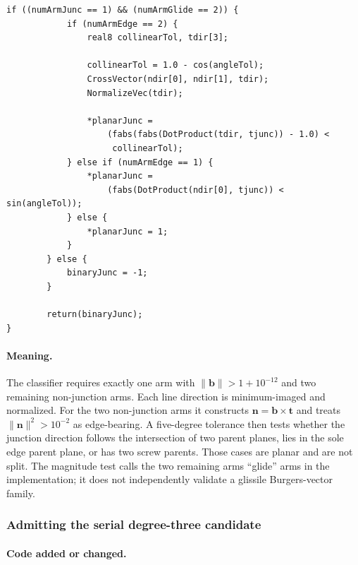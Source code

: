 \documentclass[11pt]{article}
\newcommand{\vect}[1]{\bm{#1}}
\begin{document}
\begin{lstlisting}[style=cpp]
        if ((numArmJunc == 1) && (numArmGlide == 2)) {
            if (numArmEdge == 2) {
                real8 collinearTol, tdir[3];

                collinearTol = 1.0 - cos(angleTol);
                CrossVector(ndir[0], ndir[1], tdir);
                NormalizeVec(tdir);

                *planarJunc =
                    (fabs(fabs(DotProduct(tdir, tjunc)) - 1.0) <
                     collinearTol);
            } else if (numArmEdge == 1) {
                *planarJunc =
                    (fabs(DotProduct(ndir[0], tjunc)) < sin(angleTol));
            } else {
                *planarJunc = 1;
            }
        } else {
            binaryJunc = -1;
        }

        return(binaryJunc);
}
\end{lstlisting}

\paragraph{Meaning.}
The classifier requires exactly one arm with
$\lVert\vect b\rVert>1+10^{-12}$ and two remaining non-junction arms.  Each
line direction is minimum-imaged and normalized.  For the two non-junction
arms it constructs $\vect n=\vect b\times\vect t$ and treats
$\lVert\vect n\rVert^2>10^{-2}$ as edge-bearing.  A five-degree tolerance
then tests whether the junction direction follows the intersection of two
parent planes, lies in the sole edge parent plane, or has two screw parents.
Those cases are planar and are not split.  The magnitude test calls the two
remaining arms ``glide'' arms in the implementation; it does not independently
validate a glissile Burgers-vector family.

\subsubsection{Admitting the serial degree-three candidate}

\paragraph{Code added or changed.}
\end{document}
